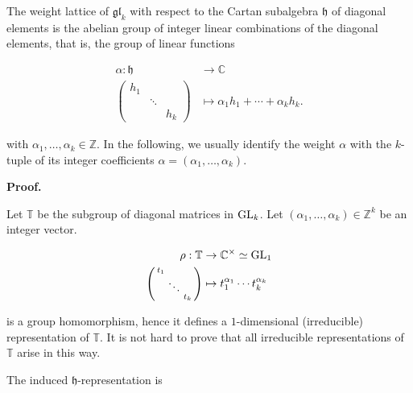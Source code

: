The weight lattice of $\mathfrak{gl}_{k}$ with respect to the Cartan subalgebra $\mathfrak{h}$ of diagonal elements is the abelian group of integer linear combinations of the diagonal elements, that is, the group of linear functions



\[\begin{aligned}
\displaystyle\alpha:\mathfrak{h} & \displaystyle\to\mathbb{C} \\
\displaystyle\left(\begin{smallmatrix}h_{1}&&\\ &\ddots&\\ &&h_{k}\end{smallmatrix}\right) & \displaystyle\mapsto\alpha_{1}h_{1}+\cdots+\alpha_{k}h_{k}.
\end{aligned}\]


with $\alpha_{1},\ldots,\alpha_{k}\in\mathbb{Z}$. In the following, we usually identify the weight $\alpha$ with the $k$-tuple of its integer coefficients $\alpha=(\alpha_{1},\ldots,\alpha_{k})$.






\par\medskip\noindent\textbf{Proof.}\par




Let $\mathbb{T}$ be the subgroup of diagonal matrices in $\textnormal{GL}_{k}$. Let $(\alpha_{1},\ldots,\alpha_{k})\in\mathbb{Z}^{k}$ be an integer vector.



\[\begin{aligned}
\displaystyle\rho:\mathbb{T} & \displaystyle\to\mathbb{C}^{\times}\simeq\textnormal{GL}_{1} \\
\displaystyle\left(\begin{smallmatrix}t_{1}&&\\ &\ddots&\\ &&t_{k}\end{smallmatrix}\right) & \displaystyle\mapsto t_{1}^{\alpha_{1}}\cdots t_{k}^{\alpha_{k}}
\end{aligned}\]


is a group homomorphism, hence it defines a $1$-dimensional (irreducible) representation of $\mathbb{T}$. It is not hard to prove that all irreducible representations of $\mathbb{T}$ arise in this way.





The induced $\mathfrak{h}$-representation is




